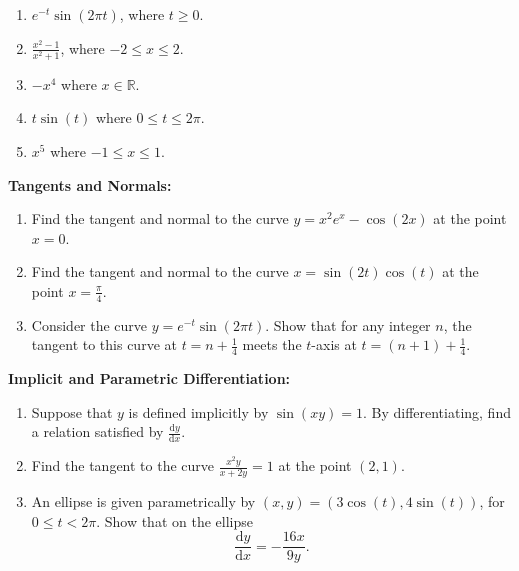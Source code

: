 \documentclass{article}
\newcommand{\deriv}[2]{\frac{\mathrm{d}#1}{\mathrm{d}#2}}
\begin{document}
\begin{enumerate}
	\item $e^{-t}\sin(2\pi t)$, where $t\geq 0$.
	\item $\frac{x^2-1}{x^2+1}$, where $-2\leq x\leq 2$.
	\item $-x^4$ where $x\in\mathbb{R}$.
	\item $t\sin(t)$ where $0\leq t \leq 2\pi$.
	\item $x^5$ where $-1\leq x\leq 1$.
\end{enumerate}


\clearpage

\textbf{Tangents and Normals:}

\vspace{5mm}


\begin{enumerate}
	\item Find the tangent and normal to the curve $y=x^2e^x-\cos(2x)$ at the point $x=0$.
	\item Find the tangent and normal to the curve $x=\sin(2t)\cos(t)$ at the point $x=\frac{\pi}{4}$.
	\item Consider the curve $y=e^{-t}\sin(2\pi t)$. Show that for any integer $n$, the tangent to this curve at $t=n+\frac{1}{4}$ meets the $t$-axis at $t=(n+1)+\frac{1}{4}$.
\end{enumerate}



\clearpage



\textbf{Implicit and Parametric Differentiation:}

\vspace{5mm}


\begin{enumerate}
	\item Suppose that $y$ is defined implicitly by $\sin(xy)=1$. By differentiating, find a relation satisfied by $\deriv{y}{x}$.
	\item Find the tangent to the curve $\frac{x^2y}{x+2y}=1$ at the point $(2,1)$.
	\item An ellipse is given parametrically by $(x,y)=(3\cos(t),4\sin(t))$, for $0\leq t < 2\pi$. Show that on the ellipse
		\[\deriv{y}{x} = -\frac{16x}{9y}.\]
\end{enumerate}
\end{document}

